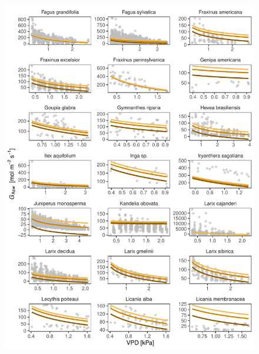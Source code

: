 \documentclass[11pt,twoside]{reedthesis}
\begin{document}
\begin{figure}[H]

{\centering \includegraphics[width=1\linewidth]{figure/appendixD/ggg3} 

}

\end{figure}
\end{document}
